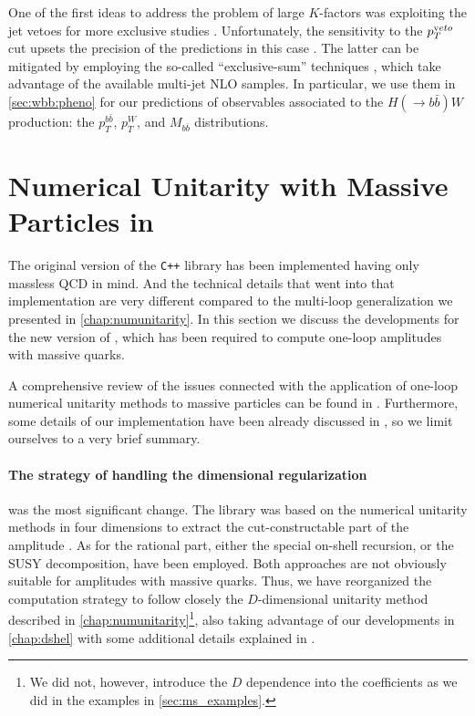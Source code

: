 One of the first ideas to address the problem of large $K$-factors was exploiting the jet vetoes 
for more exclusive studies \cite{FebresCordero:2006sj}.
Unfortunately, the sensitivity to the $p_T^{\textrm veto}$ cut upsets
the precision  of the predictions in this case \cite{Tackmann:2012bt}.
The latter can be mitigated by employing the so-called ``exclusive-sum'' techniques \cite{ESums},
which take advantage of the available multi-jet NLO samples.
In particular, we use them in \cref{sec:wbb:pheno} for our predictions of observables associated to the  $H(\rightarrow b{\bar b})W$ 
production: the $p_T^{b\bar b}$, $p_T^W$, and $M_{b\bar b}$ distributions.


\section{Numerical Unitarity with Massive Particles in \BlackHat{}}
\label{sec:BHMassiveImpl}

The original version of the \texttt{C++} library \BlackHat{} \cite{Berger:2008sj,Berger:2008ag} has been
implemented having only massless QCD in mind. 
And the technical details that went into that implementation are very different compared to
the multi-loop generalization we presented in \cref{chap:numunitarity}.
In this section we discuss the developments for the new version of \BlackHat{},
which has been required to compute one-loop amplitudes with massive quarks.

A comprehensive review of the issues connected with the application of
one-loop numerical unitarity methods to massive particles can be found in \cite{Ellis:2011cr,Ellis:2008ir}.
Furthermore, some details of our implementation have been already discussed in \cite{FelixDiss,Anger:2018ove},
so we limit ourselves to a very brief summary.

\paragraph{The strategy of handling the dimensional regularization}
was the most significant change.
The \BlackHat{} library was based on the numerical unitarity methods in four dimensions to extract the cut-constructable part
of the amplitude \cite{Ita:2011hi,Berger:2008sj,Berger:2008ag}. As for the rational part, either the special on-shell recursion, or the SUSY decomposition, have been employed.
Both approaches are not obviously suitable for amplitudes with massive quarks.
Thus, we have reorganized the computation strategy to follow closely the $D$-dimensional unitarity method described in \cref{chap:numunitarity}\footnote{
  We did not, however, introduce the $D$ dependence into the coefficients as we did in the examples in \cref{sec:ms_examples}.
},
also taking advantage of our developments in \cref{chap:dshel} with some additional details explained in \cite{Anger:2018ove}.

